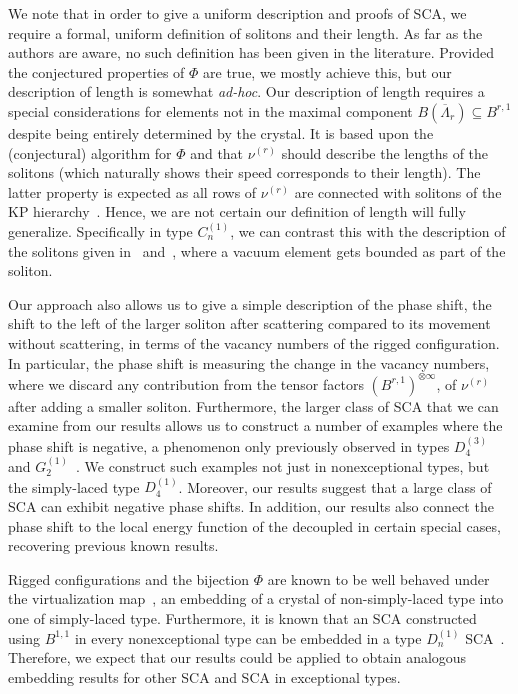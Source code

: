 \documentclass[reqno]{amsart}
\newcommand{\clfw}{\overline{\Lambda}} %
\theoremstyle{plain}
\theoremstyle{definition}
\numberwithin{equation}{section}
\begin{document}
We note that in order to give a uniform description and proofs of SCA, we require a formal, uniform definition of solitons and their length.
As far as the authors are aware, no such definition has been given in the literature.
Provided the conjectured properties of $\Phi$ are true, we mostly achieve this, but our description of length is somewhat \textit{ad-hoc}.
Our description of length requires a special considerations for elements not in the maximal component $B(\clfw_r) \subseteq B^{r,1}$ despite being entirely determined by the crystal.
It is based upon the (conjectural) algorithm for $\Phi$ and that $\nu^{(r)}$ should describe the lengths of the solitons (which naturally shows their speed corresponds to their length).
The latter property is expected as all rows of $\nu^{(r)}$ are connected with solitons of the KP hierarchy~\cite{KSY07}.
Hence, we are not certain our definition of length will fully generalize.
Specifically in type $C_n^{(1)}$, we can contrast this with the description of the solitons given in~\cite[Sec.~2.3]{HKOTY02} and~\cite[Sec.~3.2]{HKT00}, where a vacuum element gets bounded as part of the soliton.

Our approach also allows us to give a simple description of the phase shift, the shift to the left of the larger soliton after scattering compared to its movement without scattering, in terms of the vacancy numbers of the rigged configuration.
In particular, the phase shift is measuring the change in the vacancy numbers, where we discard any contribution from the tensor factors $(B^{r,1})^{\otimes \infty}$, of $\nu^{(r)}$ after adding a smaller soliton.
Furthermore, the larger class of SCA that we can examine from our results allows us to construct a number of examples where the phase shift is negative, a phenomenon only previously observed in types $D_4^{(3)}$~\cite{Yamada07} and $G_2^{(1)}$~\cite{MOW12}.
We construct such examples not just in nonexceptional types, but the simply-laced type $D_4^{(1)}$.
Moreover, our results suggest that a large class of SCA can exhibit negative phase shifts.
In addition, our results also connect the phase shift to the local energy function of the decoupled in certain special cases, recovering previous known results.

Rigged configurations and the bijection $\Phi$ are known to be well behaved under the virtualization map~\cite{OSS17, OSS03III, OSS03II, SchillingS15, Scrimshaw15, Scrimshaw17}, an embedding of a crystal of non-simply-laced type into one of simply-laced type.
Furthermore, it is known that an SCA constructed using $B^{1,1}$ in every nonexceptional type can be embedded in a type $D_n^{(1)}$ SCA~\cite{KTT04}.
Therefore, we expect that our results could be applied to obtain analogous embedding results for other SCA and SCA in exceptional types.
\end{document}
